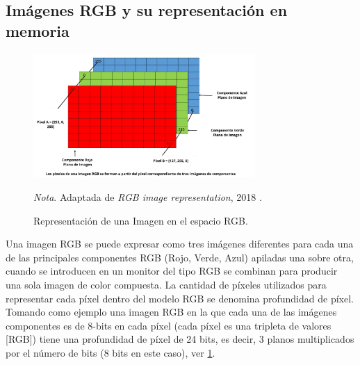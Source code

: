\subsection{Imágenes RGB y su representación en memoria} \label{sub:imágenes_RGB_y_su_representación_en_memoria}
\begin{figure}[h]
    \centering
    \includegraphics[width=0.75\textwidth]{Figures/Figures_Cap02/rgb_pixels.png}
    \caption{Representación de una Imagen en el espacio RGB.}
    \textit{Nota}. Adaptada de \textit{RGB image representation}, 2018 \cite{RGBImageRepresentation}.
    \label{fig:rgb_pixels}
\end{figure}

Una imagen RGB se puede expresar como tres imágenes diferentes para cada una de las principales componentes RGB (Rojo, Verde, Azul) apiladas una sobre otra, cuando se introducen en un monitor del tipo RGB se combinan para producir una sola imagen de color compuesta. 
La cantidad de píxeles utilizados para representar cada píxel dentro del modelo RGB se denomina profundidad de píxel. Tomando como ejemplo una imagen RGB en la que cada una de las imágenes componentes es de 8-bits en cada píxel (cada píxel es una tripleta de valores [RGB]) tiene una profundidad de píxel de 24 bits, es decir, 3 planos multiplicados por el número de bits (8 bits en este caso), ver \ref{fig:rgb_pixels}. 

